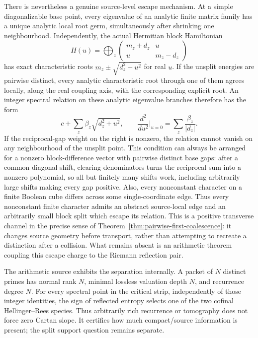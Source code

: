 \documentclass[11pt]{article}
\theoremstyle{definition}
\theoremstyle{remark}
\begin{document}
There is nevertheless a genuine source-level escape mechanism.  At a simple
diagonalizable base point, every eigenvalue of an analytic finite matrix
family has a unique analytic local root germ, simultaneously after shrinking
one neighbourhood.  Independently, the actual Hermitian block Hamiltonian
\[
 H(u)=\bigoplus_z
 \begin{pmatrix}m_z+d_z&u\\u&m_z-d_z\end{pmatrix}
\]
has exact characteristic roots \(m_z\pm\sqrt{d_z^2+u^2}\) for real \(u\).
If the unsplit energies are pairwise distinct, every analytic characteristic
root through one of them agrees locally, along the real coupling axis, with
the corresponding explicit root.  An integer spectral relation on these
analytic eigenvalue branches therefore has the form
\[
                c+\sum_z\beta_z\sqrt{d_z^2+u^2},
\qquad
 \frac{d^2}{du^2}\bigg|_{u=0}
                =\sum_z\frac{\beta_z}{|d_z|}.
\tag{3.12b}\label{eq:block-split-escape}
\]
If the reciprocal-gap weight on the right is nonzero, the relation cannot
vanish on any neighbourhood of the unsplit point.  This condition can always
be arranged for a nonzero block-difference vector with pairwise distinct
base gaps: after a common diagonal shift, clearing denominators turns the
reciprocal sum into a nonzero polynomial, so all but finitely many shifts
work, including arbitrarily large shifts making every gap positive.  Also,
every nonconstant character on a finite Boolean cube differs across some
single-coordinate edge.  Thus every nonconstant finite character admits an
abstract source-local edge and an arbitrarily small block split which escape
its relation.  This is a positive transverse channel in the precise sense of
Theorem~\ref{thm:pairwise-first-coalescence}: it changes source geometry
before transport, rather than attempting to recreate a distinction after a
collision.  What remains absent is an arithmetic theorem coupling this
escape charge to the Riemann reflection pair.

The arithmetic source exhibits the separation internally.  A packet of
\(N\) distinct primes has normal rank \(N\), minimal lossless valuation
depth \(N\), and recurrence degree \(N\).  For every spectral point in the
critical strip, independently of those integer identities, the sign of
reflected entropy selects one of the two cofinal Hellinger--Rees species.
Thus arbitrarily rich recurrence or tomography does not force zero Cartan
slope.  It certifies how much compact/source information is present; the
split support question remains separate.
\end{document}
